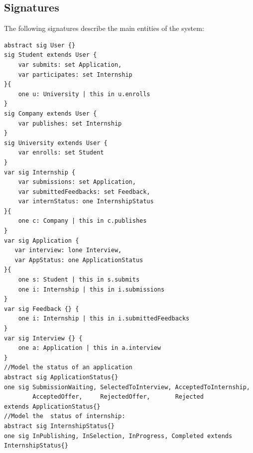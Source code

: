 \subsection{Signatures}
The following signatures describe the main entities of the system:
\begin{lstlisting}
abstract sig User {}
sig Student extends User {
    var submits: set Application,
    var participates: set Internship
}{
    one u: University | this in u.enrolls
}
sig Company extends User {
    var publishes: set Internship
}
sig University extends User {
    var enrolls: set Student
}
var sig Internship {
    var submissions: set Application,
    var submittedFeedbacks: set Feedback,
    var internStatus: one InternshipStatus
}{
    one c: Company | this in c.publishes
}
var sig Application {
   var interview: lone Interview,
   var AppStatus: one ApplicationStatus
}{
    one s: Student | this in s.submits
    one i: Internship | this in i.submissions
}
var sig Feedback {} {
    one i: Internship | this in i.submittedFeedbacks
} 
var sig Interview {} {
    one a: Application | this in a.interview
}
//Model the status of an application
abstract sig ApplicationStatus{}
one sig SubmissionWaiting, SelectedToInterview, AcceptedToInternship, 
        AcceptedOffer,     RejectedOffer,       Rejected                 extends ApplicationStatus{}
//Model the  status of internship:
abstract sig InternshipStatus{}
one sig InPublishing, InSelection, InProgress, Completed extends InternshipStatus{}
\end{lstlisting}

